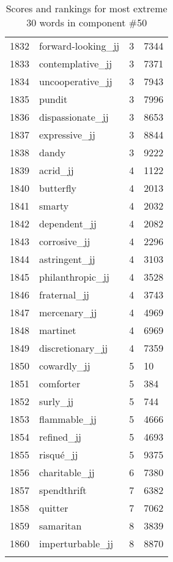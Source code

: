 \begin{longtable}[!htbp]{| rlr@{.}l |}
    1832 & forward-looking\_jj & 3 & 7344 \\
    1833 & contemplative\_jj & 3 & 7371 \\
    1834 & uncooperative\_jj & 3 & 7943 \\
    1835 & pundit & 3 & 7996 \\
    1836 & dispassionate\_jj & 3 & 8653 \\
    1837 & expressive\_jj & 3 & 8844 \\
    1838 & dandy & 3 & 9222 \\
    1839 & acrid\_jj & 4 & 1122 \\
    1840 & butterfly & 4 & 2013 \\
    1841 & smarty & 4 & 2032 \\
    1842 & dependent\_jj & 4 & 2082 \\
    1843 & corrosive\_jj & 4 & 2296 \\
    1844 & astringent\_jj & 4 & 3103 \\
    1845 & philanthropic\_jj & 4 & 3528 \\
    1846 & fraternal\_jj & 4 & 3743 \\
    1847 & mercenary\_jj & 4 & 4969 \\
    1848 & martinet & 4 & 6969 \\
    1849 & discretionary\_jj & 4 & 7359 \\
    1850 & cowardly\_jj & 5 & 10 \\
    1851 & comforter & 5 & 384 \\
    1852 & surly\_jj & 5 & 744 \\
    1853 & flammable\_jj & 5 & 4666 \\
    1854 & refined\_jj & 5 & 4693 \\
    1855 & risqué\_jj & 5 & 9375 \\
    1856 & charitable\_jj & 6 & 7380 \\
    1857 & spendthrift & 7 & 6382 \\
    1858 & quitter & 7 & 7062 \\
    1859 & samaritan & 8 & 3839 \\
    1860 & imperturbable\_jj & 8 & 8870 \\
    \hline
    \caption{Scores and rankings for most extreme 30 words in component \#50} \\
\end{longtable}

